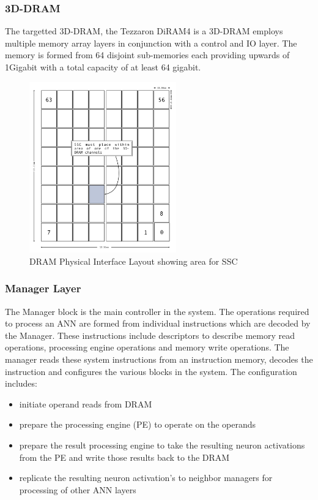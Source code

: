 \documentclass[journal]{IEEEtran}
\begin{document}
\subsubsection{3D-DRAM}
The targetted 3D-DRAM, the Tezzaron DiRAM4 is a 3D-DRAM employs multiple memory array layers in conjunction with a control and IO layer.
The memory is formed from 64 disjoint sub-memories each providing upwards of 1Gigabit with a total capacity of at least 64 gigabit.
\begin{figure}[!t]
\captionsetup{width=.9\linewidth}
\centerline{
\mbox{\includegraphics[width=2.5in]{DiRAM4Layout.jpg}}
}
\caption{DRAM Physical Interface Layout showing area for SSC}
\label{fig:diram4Layout}
\end{figure}


\subsubsection{Manager Layer}
The Manager block is the main controller in the system. The operations required to process an ANN are formed from individual instructions which are decoded by the Manager. 
These instructions include descriptors to describe memory read operations, processing engine operations and memory write operations. The manager reads these system instructions from an instruction memory, decodes the instruction and configures the various blocks in the system.
The configuration includes:
\begin{itemize}

      \item initiate operand reads from DRAM
      \item prepare the processing engine (PE) to operate on the operands
      \item prepare the result processing engine to take the resulting neuron activations from the PE and write those results back to the DRAM
      \item replicate the resulting neuron activation's to neighbor managers for processing of other ANN layers

\end{itemize}
\end{document}
